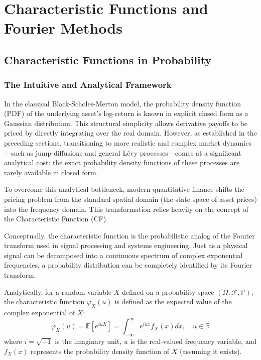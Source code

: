 \section{Characteristic Functions and Fourier Methods}
\subsection{Characteristic Functions in Probability}
\subsubsection{The Intuitive and Analytical Framework}

In the classical Black-Scholes-Merton model, the probability density function (PDF) of the underlying asset's log-return is known in explicit closed form as a Gaussian distribution. This structural simplicity allows derivative payoffs to be priced by directly integrating over the real domain. However, as established in the preceding sections, transitioning to more realistic and complex market dynamics---such as jump-diffusions and general L\'evy processes---comes at a significant analytical cost: the exact probability density functions of these processes are rarely available in closed form.

To overcome this analytical bottleneck, modern quantitative finance shifts the pricing problem from the standard spatial domain (the state space of asset prices) into the frequency domain. This transformation relies heavily on the concept of the Characteristic Function (CF).

Conceptually, the characteristic function is the probabilistic analog of the Fourier transform used in signal processing and systems engineering. Just as a physical signal can be decomposed into a continuous spectrum of complex exponential frequencies, a probability distribution can be completely identified by its Fourier transform. 

Analytically, for a random variable $X$ defined on a probability space $(\Omega, \mathcal{F}, \mathbb{P})$, the characteristic function $\varphi_X(u)$ is defined as the expected value of the complex exponential of $X$:
\begin{equation}
    \varphi_X(u) = \mathbb{E}[e^{iuX}] = \int_{-\infty}^{\infty} e^{iux} f_X(x) dx, \quad u \in \mathbb{R}
\end{equation}
where $i = \sqrt{-1}$ is the imaginary unit, $u$ is the real-valued frequency variable, and $f_X(x)$ represents the probability density function of $X$ (assuming it exists).

